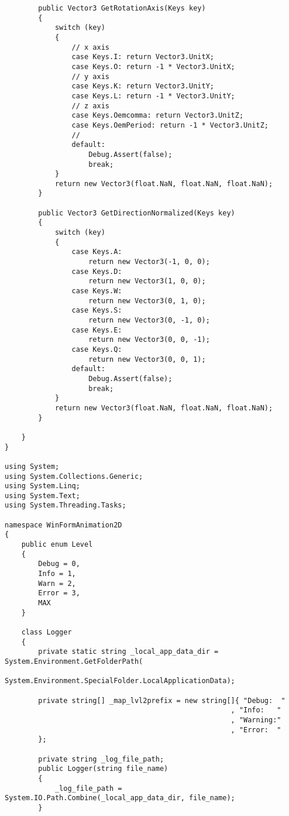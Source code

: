 \begin{scriptsize}
\begin{verbatim}
        public Vector3 GetRotationAxis(Keys key)
        {
            switch (key)
            {
                // x axis
                case Keys.I: return Vector3.UnitX;
                case Keys.O: return -1 * Vector3.UnitX;
                // y axis
                case Keys.K: return Vector3.UnitY;
                case Keys.L: return -1 * Vector3.UnitY;
                // z axis
                case Keys.Oemcomma: return Vector3.UnitZ;
                case Keys.OemPeriod: return -1 * Vector3.UnitZ;
                //
                default:
                    Debug.Assert(false);
                    break;
            }
            return new Vector3(float.NaN, float.NaN, float.NaN);
        }

        public Vector3 GetDirectionNormalized(Keys key)
        {
            switch (key)
            {
                case Keys.A:
                    return new Vector3(-1, 0, 0);
                case Keys.D:
                    return new Vector3(1, 0, 0);
                case Keys.W:
                    return new Vector3(0, 1, 0);
                case Keys.S:
                    return new Vector3(0, -1, 0);
                case Keys.E:
                    return new Vector3(0, 0, -1);
                case Keys.Q:
                    return new Vector3(0, 0, 1);
                default:
                    Debug.Assert(false);
                    break;
            }
            return new Vector3(float.NaN, float.NaN, float.NaN);
        }

    }
}

using System;
using System.Collections.Generic;
using System.Linq;
using System.Text;
using System.Threading.Tasks;

namespace WinFormAnimation2D
{
    public enum Level
    {
        Debug = 0,
        Info = 1,
        Warn = 2,
        Error = 3,
        MAX
    }

    class Logger
    {
        private static string _local_app_data_dir = System.Environment.GetFolderPath(
                System.Environment.SpecialFolder.LocalApplicationData);

        private string[] _map_lvl2prefix = new string[]{ "Debug:  "
                                                      , "Info:   "
                                                      , "Warning:"
                                                      , "Error:  "
        };

        private string _log_file_path;
        public Logger(string file_name)
        {
            _log_file_path = System.IO.Path.Combine(_local_app_data_dir, file_name);
        }


\end{verbatim}
\end{scriptsize}
